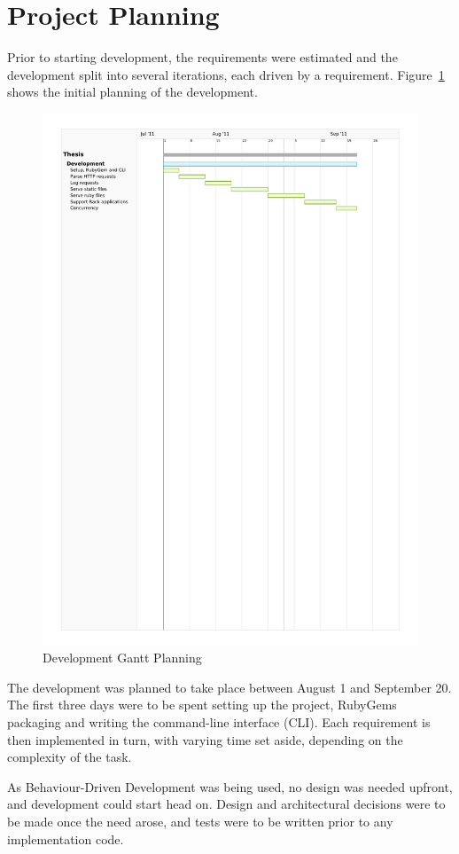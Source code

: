 \section{Project Planning}
Prior to starting development, the requirements were estimated and the
development split into several iterations, each driven by a requirement.
Figure~\ref{gantt} shows the initial planning of the development.

\begin{figure}[htb]
  \centering
  \includegraphics[width=1.0\textwidth]{img/gantt.pdf}
  \caption{Development Gantt Planning}
  \label{gantt}
\end{figure}

The development was planned to take place between August 1 and September 20.
The first three days were to be spent setting up the project, RubyGems
packaging and writing the command-line interface (CLI). Each requirement is
then implemented in turn, with varying time set aside, depending on the
complexity of the task.

As Behaviour-Driven Development was being used, no design was needed upfront,
and development could start head on. Design and architectural decisions were
to be made once the need arose, and tests were to be written prior to any
implementation code.
